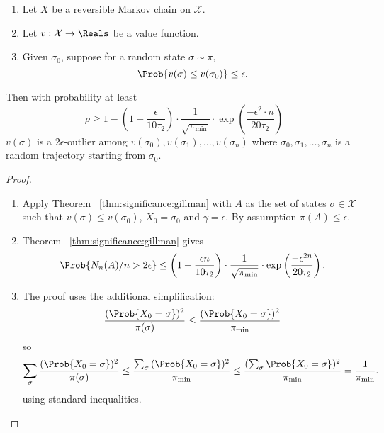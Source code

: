 \documentclass[12pt]{article}
\begin{document}
\begin{theorem}
    \label{thm:significance:powerthm}
    \begin{enumerate}
        \item
            Let \( X \) be a reversible Markov chain on \( \mathcal{X} \).
        \item
            Let \( v :  \mathcal{X} \to \Reals \) be a value function.
        \item
            Given \( \sigma_0 \), suppose for a random state \( \sigma
            \sim \pi \),
            \[
                \Prob{v(\sigma) \le v(\sigma_0)} \le \epsilon.
            \]
    \end{enumerate}
    Then with probability at least
    \[
        \rho \ge 1 - \left( 1 + \frac{\epsilon}{10 \tau_2} \right) \cdot
        \frac{1}{\sqrt{\pi_{\min}}} \cdot \exp \left( \frac {-\epsilon^
        {2} \cdot n}{20 \tau_{2}} \right)
    \] \( v(\sigma) \) is a \( 2\epsilon \)-outlier among \( v(\sigma_0),
    v(\sigma_1), \dots, v(\sigma_n) \) where \( \sigma_0, \sigma_1,
    \dots, \sigma_n \) is a random trajectory starting from \( \sigma_0 \).
\end{theorem}

\begin{proof}
    \begin{enumerate}
        \item
            Apply Theorem~%
            \ref{thm:significance:gillman} with \( A \) as the set of
            states \( \sigma \in \mathcal{X} \) such that \( v(\sigma)
            \le v(\sigma_0) \), \( X_0 = \sigma_0 \) and \( \gamma =
            \epsilon \).  By assumption \( \pi(A) \le \epsilon \).
        \item
            Theorem~%
            \ref{thm:significance:gillman} gives
            \[
                \Prob{N_{n}(A)/n > 2\epsilon} \le \left( 1 + \frac{\epsilon
                n}{10 \tau_2} \right) \cdot \frac{1}{\sqrt{\pi_{\min}}}
                \cdot \exp \left( \frac{-\epsilon^{2 n}}{20 \tau_2}
                \right).
            \]
        \item
            The  proof uses the additional
            simplification:
            \[
                \frac{(\Prob{X_0 = \sigma})^2}{\pi (\sigma)} \le \frac{(\Prob
                {X_0 = \sigma})^2}{\pi_{\min}}
            \] so
            \[
                \sum_{\sigma} \frac{(\Prob{X_0 =\sigma})^2}{\pi (\sigma)}
                \le \frac{\sum_{\sigma}{(\Prob{X_0 =\sigma})^2}}{\pi_{\min}}
                \le \frac{(\sum_{\sigma}\Prob{X_0 =\sigma})^2}{\pi_{\min}}
                = \frac{1}{\pi_{\min}}.
            \] using standard inequalities.
    \end{enumerate}
\end{proof}
\end{document}
